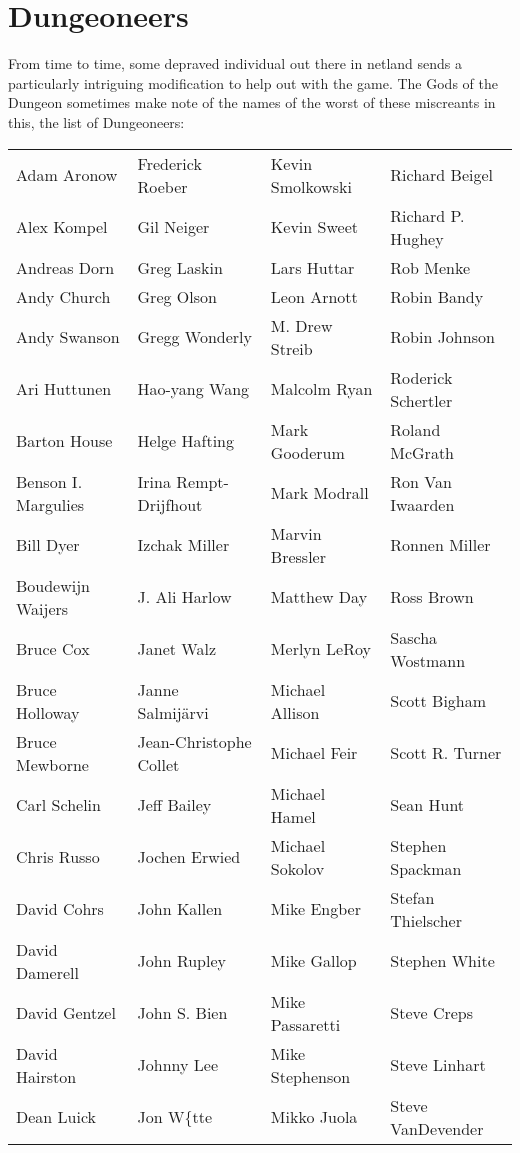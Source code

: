 \section*{Dungeoneers}
\nd From time to time, some depraved individual out there in netland sends a
particularly intriguing modification to help out with the game.  The Gods of
the Dungeon sometimes make note of the names of the worst of these miscreants
in this, the list of Dungeoneers:
\begin{center}
\begin{tabular}{llll}
Adam Aronow & Frederick Roeber & Kevin Smolkowski & Richard Beigel\\
Alex Kompel & Gil Neiger & Kevin Sweet & Richard P. Hughey\\
Andreas Dorn & Greg Laskin & Lars Huttar & Rob Menke\\
Andy Church & Greg Olson & Leon Arnott & Robin Bandy\\
Andy Swanson & Gregg Wonderly & M. Drew Streib & Robin Johnson\\
Ari Huttunen & Hao-yang Wang & Malcolm Ryan & Roderick Schertler\\
Barton House & Helge Hafting & Mark Gooderum & Roland McGrath\\
Benson I. Margulies & Irina Rempt-Drijfhout & Mark Modrall & Ron Van Iwaarden\\
Bill Dyer & Izchak Miller & Marvin Bressler & Ronnen Miller\\
Boudewijn Waijers & J. Ali Harlow & Matthew Day & Ross Brown\\
Bruce Cox & Janet Walz & Merlyn LeRoy & Sascha Wostmann\\
Bruce Holloway & Janne Salmij\"{a}rvi & Michael Allison & Scott Bigham\\
Bruce Mewborne & Jean-Christophe Collet & Michael Feir & Scott R. Turner\\
Carl Schelin & Jeff Bailey & Michael Hamel & Sean Hunt\\
Chris Russo & Jochen Erwied & Michael Sokolov & Stephen Spackman\\
David Cohrs & John Kallen & Mike Engber & Stefan Thielscher\\
David Damerell & John Rupley & Mike Gallop & Stephen White\\
David Gentzel & John S. Bien & Mike Passaretti & Steve Creps\\
David Hairston & Johnny Lee & Mike Stephenson & Steve Linhart\\
Dean Luick & Jon W\{tte & Mikko Juola & Steve VanDevender\\

\end{tabular}
\end{center}
